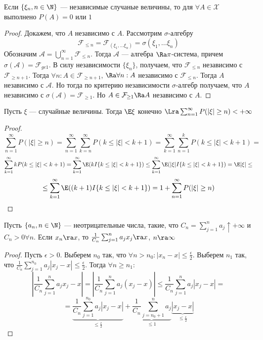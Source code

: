 \begin{theorem}
    Если \(\{\xi_n, n \in \N\}\) --- независимые случаные величины, то для \(\forall A \in \mathcal{X}\) выполнено \(P(A) = 0\) или \(1\)
\end{theorem}
\begin{proof}
    Докажем, что \(A\) независимо с \(A\). Рассмотрим \(\sigma\)-алгебру 
    \[\mathcal{F}_{\le n} = \mathcal{F}_{(\xi_1, \dots \xi_n)} = \sigma(\xi_1, \dots \xi_n)\]
    Обозначим \(\mathcal{A} = \bigcup_{n = 1}^\infty \mathcal{F}_{\le n}\). Тогда \(\mathcal{A}\) --- алгебра \(\Ra \pi\)-система, причем \(\sigma(\mathcal{A}) = \mathcal{F}_{ge 1}\). В силу независимости \(\{\xi_n\}\), получаем, что \(\mathcal{F}_{\le n}\) независимо с \(\mathcal{F}_{\ge n + 1}\). Тогда \(\forall n: A \in \mathcal{F}_{\ge n + 1}\), \(\Ra \forall n: A\) независимо с \(\mathcal{F}_{\le n}\). Тогда \(A\) независимо с \(\mathcal{A}\). Но тогда по критерию независимости \(\sigma\)-алгебр получаем, что \(A\) независимо с \(\sigma(\mathcal{A}) = \mathcal{F}_{\ge 1}\). Но \(A \in \mathcal{F}_{\ge 1} \Ra A\) независимо с \(A\).
\end{proof}

\begin{proposition}
    Пусть \(\xi\) --- случайные величины. Тогда \(\E\xi\) конечно \(\Lra \sum_{n = 1}^\infty P(|\xi| \ge n) < +\infty\) 
\end{proposition}
\begin{proof}
    \[\sum_{n = 1}^\infty P(|\xi| \ge n) = \sum_{n = 1}^\infty \sum_{k = n}^\infty P(k \le |\xi| < k + 1) = \sum_{k = 1}^\infty \sum_{n = 1}^k P(k \le |\xi| < k + 1) = \]
    \[\sum_{k = 1}^\infty k P(k \le |\xi| < k + 1) = \sum_{k = 1}^\infty \E(kI\{k \le |\xi| < k + 1\}) \le \sum_{k = 1}^\infty \E(|\xi|I\{k \le |\xi| < k + 1\}) = \E|\xi| \le \]
    \[\le \sum_{k = 1}^\infty \E((k + 1)I\{k \le |\xi| < k + 1\}) = 1 + \sum_{n = 1}^\infty P(|\xi| \ge n)\]
\end{proof}

\begin{lemma}[Тёплица]
    Пусть \(\{a_n, n \in \N\}\) --- неотрицательные числа, такие, что \(C_n = \sum_{j = 1}^n a_j \uparrow +\infty\) и \(C_n > 0 \forall n\). Если \(x_n \ra x\), то \(\frac{1}{C_n}\sum_{j = 1}^n a_jx_j \ra x\), \(n \ra \infty\)
\end{lemma}
\begin{proof}
    Пусть \(\epsilon > 0\). Выберем \(n_0\) так, что \(\forall n > n_0: |x_n - x| \le \frac{\epsilon}{2}\). Выберем \(n_1\) так, что \(\frac{1}{C_n}\sum_{j = 1}^{n_0}a_j|x_j - x| \le \frac{\epsilon}{2}\). Тогда \(\forall n \ge n_1\):
    \[\left| \frac{1}{C_n}\sum_{j = 1}^n a_jx_j - x \right| = \left| \frac{1}{C_n}\sum_{j = 1}^n a_j(x_j - x) \right| \le \frac{1}{C_n}\sum_{j = 1}^{n}a_j|x_j - x| =\]
    \[= \underbrace{\frac{1}{C_n}\sum_{j = 1}^{n_0}a_j|x_j - x|}_{\le \frac{\epsilon}{2}} + \underbrace{\frac{1}{C_n}\sum_{j = n_0 + 1}^{n}a_j}_{\le 1}\underbrace{|x_j - x|}_{\le \frac{\epsilon}{2}}\]
\end{proof}

